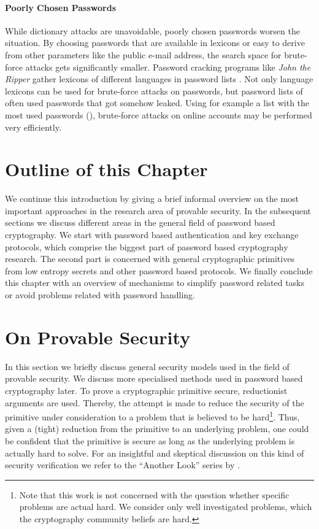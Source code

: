 \paragraph{Poorly Chosen Passwords}
While dictionary attacks are unavoidable, poorly chosen passwords worsen the situation.
By choosing passwords that are available in lexicons or easy to derive from other parameters like the public e-mail address, the search space for brute-force attacks gets significantly smaller.
Password cracking programs like \emph{John the Ripper} \cite{JohnTheRipper} gather lexicons of different languages in password lists \cite{JohnTheRipperWordlist}.
Not only language lexicons can be used for brute-force attacks on passwords, but password lists of often used passwords that got somehow leaked.
Using for example a list with the most used passwords (\eg \cite{XatoPwds}), brute-force attacks on online accounts may be performed very efficiently.

\section{Outline of this Chapter}

We continue this introduction by giving a brief informal overview on the most important approaches in the research area of provable security.
In the subsequent sections we discuss different areas in the general field of password based cryptography.
We start with password based authentication and key exchange protocols, which comprise the biggest part of password based cryptography research.
The second part is concerned with general cryptographic primitives from low entropy secrets and other password based protocols.
We finally conclude this chapter with an overview of mechanisms to simplify password related tasks or avoid problems related with password handling.


\section{On Provable Security}
In this section we briefly discuss general security models used in the field of provable security.
We discuss more specialised methods used in password based cryptography later.
To prove a cryptographic primitive secure, reductionist arguments are used.
Thereby, the attempt is made to reduce the security of the primitive under consideration to a problem that is believed to be hard\footnote{Note that this work is not concerned with the question whether specific problems are actual hard. We consider only well investigated problems, which the cryptography community beliefs are hard.}.
Thus, given a (tight) reduction from the primitive to an underlying problem, one could be confident that the primitive is secure as long as the underlying problem is actually hard to solve.
For an insightful and skeptical discussion on this kind of security verification we refer to the ``Another Look'' series by \citeauthor{AnotherLook} \cite{AnotherLook}.

